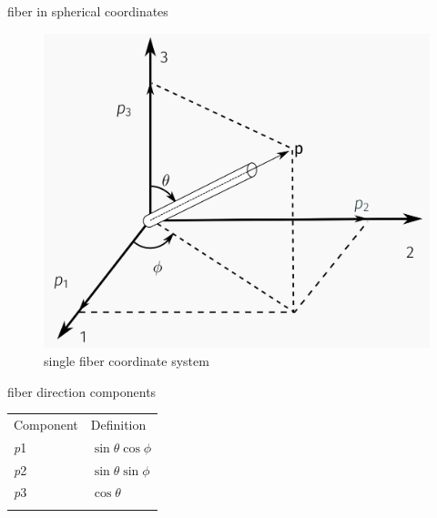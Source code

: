 \documentclass[
  letterpaper,
  ignorenonframetext,
  aspectratio=43,
  handout,
  12pt]{beamer}
\let\Oldincludegraphics\includegraphics
\renewcommand{\includegraphics}[2][]{\Oldincludegraphics[width=\textwidth,height=0.7\textheight,keepaspectratio]{#2}}
\begin{document}
\begin{frame}{fiber in spherical coordinates}
\protect\hypertarget{fiber-in-spherical-coordinates}{}
\begin{figure}
\centering
\includegraphics{../images/single_fiber.png}
\caption{single fiber coordinate system}
\end{figure}
\end{frame}

\begin{frame}{fiber direction components}
\protect\hypertarget{fiber-direction-components}{}
\begin{longtable}[]{@{}ll@{}}
\toprule
Component & Definition \\ \addlinespace
\midrule
\endhead
\emph{p}1 & \(\sin \theta \cos \phi\) \\ \addlinespace
\emph{p}2 & \(\sin \theta \sin \phi\) \\ \addlinespace
\emph{p}3 & \(\cos \theta\) \\ \addlinespace
\bottomrule
\end{longtable}
\end{frame}
\end{document}
